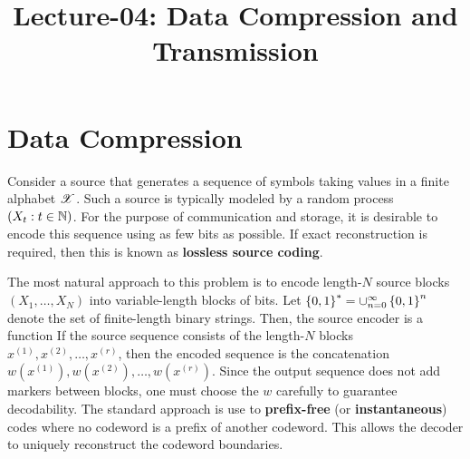\documentclass[letterpaper,10pt,english]{article}
\title{Lecture-04: Data Compression and Transmission}
\author{}
\begin{document}
\maketitle

\section{ Data Compression}
Consider a source that generates a sequence of symbols taking values in a finite alphabet $\mathscr{X}$.  
Such a source is typically modeled by a random process $(X_t: t \in \mathbb{N})$. 
For the purpose of communication and storage, 
it is desirable to encode this sequence using as few bits as possible. 
If exact reconstruction is required, then this is known as \textbf{lossless source coding}.  

The most natural approach to this problem is to encode length-$N$ source blocks 
$(X_1, \dots , X_N)$ into variable-length blocks of bits. 
Let $\left\{0, 1\right\}^{\ast} = \cup_{n=0}^{\infty}\left\{0, 1\right\}^n$ denote the set of finite-length binary strings. Then, the source encoder is a function 
If the source sequence consists of the length-$N$ blocks $x^{(1)},x^{(2)}, \dots,x^{(r)}$, 
then the encoded sequence is the concatenation $w(x^{(1)}), w(x^{(2)}), \dots, w(x^{(r)})$. 
Since the output sequence does not add markers between blocks, one must choose the $w$ carefully to guarantee decodability. The standard approach is use to \textbf{prefix-free} (or \textbf{instantaneous}) codes where no codeword is a prefix of another codeword. 
This allows the decoder to uniquely reconstruct the codeword boundaries. 
\end{document}
